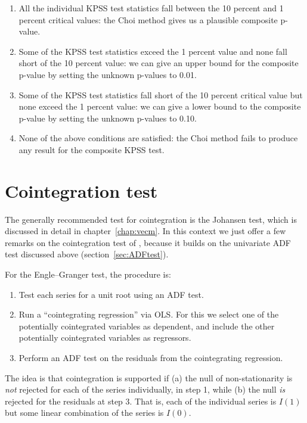 \begin{enumerate}
\item All the individual KPSS test statistics fall between the 10
  percent and 1 percent critical values: the Choi method gives us
  a plausible composite p-value.
\item Some of the KPSS test statistics exceed the 1 percent value and
  none fall short of the 10 percent value: we can give an upper bound
  for the composite p-value by setting the unknown p-values to 0.01.
\item Some of the KPSS test statistics fall short of the 10 percent
  critical value but none exceed the 1 percent value: we can give a
  lower bound to the composite p-value by setting the unknown p-values
  to 0.10.
\item None of the above conditions are satisfied: the Choi method
  fails to produce any result for the composite KPSS test.
\end{enumerate}


\section{Cointegration test}
\label{sec:coint-test}

The generally recommended test for cointegration is the Johansen test,
which is discussed in detail in chapter~\ref{chap:vecm}. In this
context we just offer a few remarks on the cointegration test of
\cite{engle-granger87}, because it builds on the univariate ADF test 
discussed above (section~\ref{sec:ADFtest}).

For the Engle--Granger test, the procedure is:
\begin{enumerate}
\item Test each series for a unit root using an ADF test.
\item Run a ``cointegrating regression'' via OLS. For this we select
  one of the potentially cointegrated variables as dependent, and
  include the other potentially cointegrated variables as regressors.
\item Perform an ADF test on the residuals from the cointegrating
  regression.
\end{enumerate}

The idea is that cointegration is supported if (a) the null of
non-stationarity is \emph{not} rejected for each of the series
individually, in step 1, while (b) the null \emph{is} rejected for the
residuals at step 3. That is, each of the individual series is $I(1)$
but some linear combination of the series is $I(0)$.  

